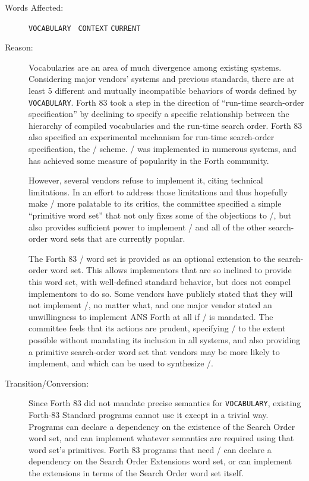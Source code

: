 \begin{description}
\item[Words Affected:]
	\texttt{VOCABULARY}	\texttt{ CONTEXT}	\texttt{CURRENT}

\item[Reason:]
	Vocabularies are an area of much divergence among existing systems.
	Considering major vendors' systems and previous standards, there
	are at least 5 different and mutually incompatible behaviors of
	words defined by \texttt{VOCABULARY}. Forth 83 took a step in the
	direction of ``run-time search-order specification'' by declining
	to specify a specific relationship between the hierarchy of
	compiled vocabularies and the run-time search order. Forth 83 also
	specified an experimental mechanism for run-time search-order
	specification, the / scheme.
	/ was implemented in numerous
	systems, and has achieved some measure of popularity in the Forth
	community.

	However, several vendors refuse to implement it, citing technical
	limitations. In an effort to address those limitations and thus
	hopefully make / more
	palatable to its critics, the committee specified a simple
	``primitive word set'' that not only fixes some of the objections
	to /, but also provides
	sufficient power to implement /
	and all of the other search-order word sets that are currently
	popular.

	The Forth 83 / word set is
	provided as an optional extension to the search-order word set.
	This allows implementors that are so inclined to provide this
	word set, with well-defined standard behavior, but does not
	compel implementors to do so. Some vendors have publicly stated
	that they will not implement /,
	no matter what, and one major vendor stated an unwillingness to
	implement ANS Forth at all if /
	is mandated. The committee feels that its actions are prudent,
	specifying / to the extent
	possible without mandating its inclusion in all systems, and also
	providing a primitive search-order word set that vendors may be
	more likely to implement, and which can be used to synthesize
	/.

\item[Transition/Conversion:]
	Since Forth 83 did not mandate precise semantics for \texttt{VOCABULARY},
	existing Forth-83 Standard programs cannot use it except in a
	trivial way. Programs can declare a dependency on the existence
	of the Search Order word set, and can implement whatever semantics
	are required using that word set's primitives. Forth 83 programs
	that need / can declare a
	dependency on the Search Order Extensions word set, or can implement
	the extensions in terms of the Search Order word set itself.
\end{description}


